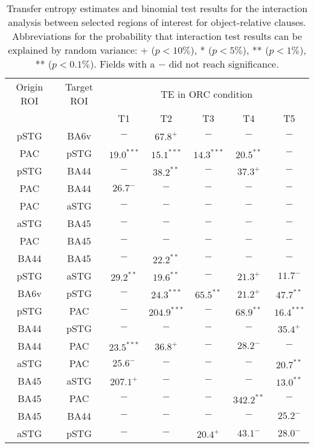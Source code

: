 \vspace{5mm}
\begin{table}[h]
\begin{center}
\begin{tabular}{ccccccc}
Origin ROI & Target ROI & \multicolumn{5}{c}{TE in ORC condition} \\
           &            &      T1 & T2 & T3 & T4 & T5             \\ \hline

pSTG & BA6v & $-$ & $67.8^{+}$ & $-$ & $-$ & $-$ \\ 
PAC & pSTG & $19.0^{***}$ & $15.1^{***}$ & $14.3^{***}$ & $20.5^{**}$ & $-$ \\ 
pSTG & BA44 & $-$ & $38.2^{**}$ & $-$ & $37.3^{+}$ & $-$ \\ 
PAC & BA44 & $26.7^{-}$ & $-$ & $-$ & $-$ & $-$ \\ 
PAC & aSTG & $-$ & $-$ & $-$ & $-$ & $-$ \\ 
aSTG & BA45 & $-$ & $-$ & $-$ & $-$ & $-$ \\ 
PAC & BA45 & $-$ & $-$ & $-$ & $-$ & $-$ \\ 
BA44 & BA45 & $-$ & $22.2^{**}$ & $-$ & $-$ & $-$ \\ 
pSTG & aSTG & $29.2^{**}$ & $19.6^{**}$ & $-$ & $21.3^{+}$ & $11.7^{-}$ \\ 
BA6v & pSTG & $-$ & $24.3^{***}$ & $65.5^{**}$ & $21.2^{+}$ & $47.7^{**}$ \\ 
pSTG & PAC & $-$ & $204.9^{***}$ & $-$ & $68.9^{**}$ & $16.4^{***}$ \\ 
BA44 & pSTG & $-$ & $-$ & $-$ & $-$ & $35.4^{+}$ \\ 
BA44 & PAC & $23.5^{***}$ & $36.8^{+}$ & $-$ & $28.2^{-}$ & $-$ \\ 
aSTG & PAC & $25.6^{-}$ & $-$ & $-$ & $-$ & $20.7^{**}$ \\ 
BA45 & aSTG & $207.1^{+}$ & $-$ & $-$ & $-$ & $13.0^{**}$ \\ 
BA45 & PAC & $-$ & $-$ & $-$ & $342.2^{**}$ & $-$ \\ 
BA45 & BA44 & $-$ & $-$ & $-$ & $-$ & $25.2^{-}$ \\ 
aSTG & pSTG & $-$ & $-$ & $20.4^{+}$ & $43.1^{-}$ & $28.0^{-}$ \\ 
\end{tabular}
\caption{\label{4.4.TEvalues.a} Transfer entropy estimates and binomial test results for the interaction analysis between selected regions of interest for object-relative clauses. Abbreviations for the probability that interaction test results can be explained by random variance: + ($p < 10\%$), * ($p < 5\%$), ** ($p < 1\%$), ** ($p < 0.1\%$). Fields with a $-$ did not reach significance.}
\end{center}
\end{table}
\vspace{5mm}

